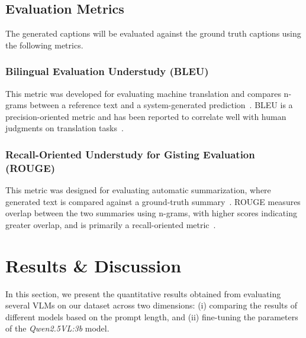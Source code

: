 \documentclass[runningheads]{llncs}
\begin{document}
\subsection{Evaluation Metrics}
The generated captions will be evaluated against the ground truth captions using the following metrics.

\subsubsection{Bilingual Evaluation Understudy (BLEU)} This metric was developed for evaluating machine translation and compares n-grams between a reference text and a system-generated prediction~\cite{Papineni2002BLEU}. BLEU is a precision-oriented metric and has been reported to correlate well with human judgments on translation tasks~\cite{Papineni2002BLEU}.

\subsubsection{Recall-Oriented Understudy for Gisting Evaluation (ROUGE)} This metric was designed for evaluating automatic summarization, where generated text is compared against a ground-truth summary~\cite{Lin2004ROUGE}. ROUGE measures overlap between the two summaries using n-grams, with higher scores indicating greater overlap, and is primarily a recall-oriented metric~\cite{Lin2004ROUGE}.



\section{Results \& Discussion}

In this section, we present the quantitative results obtained from evaluating several VLMs on our dataset across two dimensions: (i) comparing the results of different models based on the prompt length, and (ii) fine-tuning the parameters of the \textit{Qwen2.5VL:3b} model. 
\end{document}
